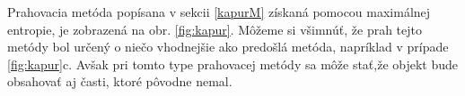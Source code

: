 \documentclass[a4paper,11pt,oneside]{article}%
\begin{document}
Prahovacia metóda popísana v sekcii \ref{kapurM} získaná pomocou maximálnej entropie, je zobrazená na obr. \ref{fig:kapur}. Môžeme si všimnúť, že prah tejto metódy bol určený o niečo vhodnejšie ako predošlá metóda, napríklad v prípade \ref{fig:kapur}c. Avšak pri tomto type prahovacej metódy sa môže stať,že objekt bude obsahovať aj časti, ktoré pôvodne nemal.

\begin{figure}[H]  
    \hspace{5px}

\end{figure}
\end{document}
